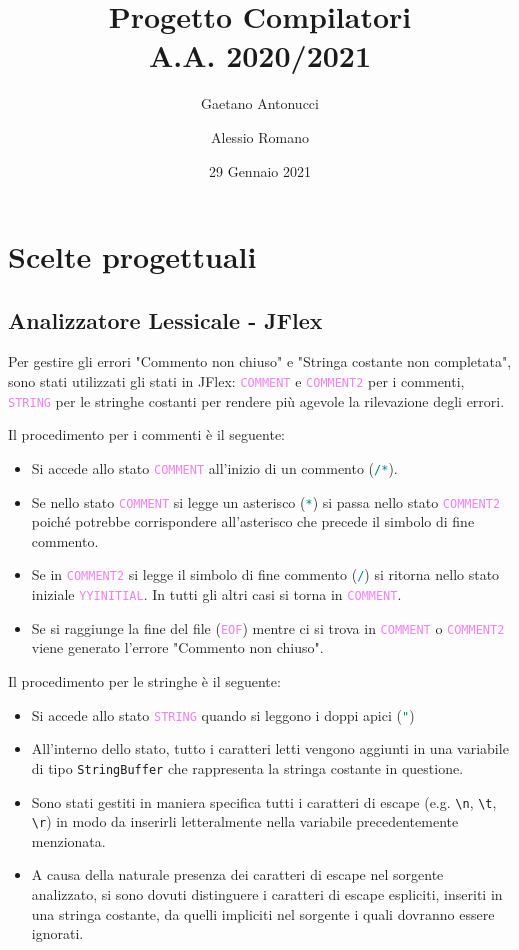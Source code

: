 \documentclass[a4paper,12pt]{article}
\title{Progetto Compilatori \\ \normalsize{A.A. 2020/2021}}
\author{Gaetano Antonucci \and Alessio Romano}
\date{29 Gennaio 2021}
\newcommand\term[1]{\texttt{\textcolor{teal}{#1}}}
\newcommand\state[1]{\textcolor{violet}{\texttt{#1}}}
\begin{document}
    \maketitle
    \tableofcontents
    \newpage

	\section{Scelte progettuali}
	\subsection{Analizzatore Lessicale - JFlex}
	
	Per gestire gli errori "Commento non chiuso" e "Stringa costante non completata", sono stati utilizzati gli stati in JFlex:
	\state{COMMENT} e \state{COMMENT2} per i commenti, \state{STRING} per le stringhe costanti per rendere più agevole 
	la rilevazione degli errori.\newline

	Il procedimento per i commenti è il seguente:
	\begin{itemize}
    	\item Si accede allo stato \state{COMMENT} all'inizio di un commento (\term{/*}).
        \item Se nello stato \state{COMMENT} si legge un asterisco (\term{*}) si passa nello stato \state{COMMENT2} poiché 
        potrebbe corrispondere all'asterisco che precede il simbolo di fine commento.
		\item Se in \state{COMMENT2} si legge il simbolo di fine commento (\term{/}) si ritorna nello stato iniziale \state{YYINITIAL}. 
			  In tutti gli altri casi si torna in \state{COMMENT}.
		\item Se si raggiunge la fine del file (\state{EOF}) mentre ci si trova in \state{COMMENT} o \state{COMMENT2} viene generato 
			  l'errore "Commento non chiuso".
	\end{itemize}

	Il procedimento per le stringhe è il seguente:
	\begin{itemize}
	\item Si accede allo stato \state{STRING} quando si leggono i doppi apici (\term{"})
	\item All'interno dello stato, tutto i caratteri letti vengono aggiunti in una variabile di tipo \texttt{StringBuffer} 
		  che rappresenta la stringa costante in questione.
	\item Sono stati gestiti in maniera specifica tutti i caratteri di escape (e.g. \verb!\n!, \verb!\t!, \verb!\r!) in modo da
          inserirli letteralmente nella variabile precedentemente menzionata.
	\item A causa della naturale presenza dei caratteri di escape nel sorgente analizzato, si sono dovuti distinguere i caratteri 
		  di escape espliciti, inseriti in una stringa costante, da quelli impliciti nel sorgente i quali dovranno essere ignorati.
	\end{itemize}
\end{document}
